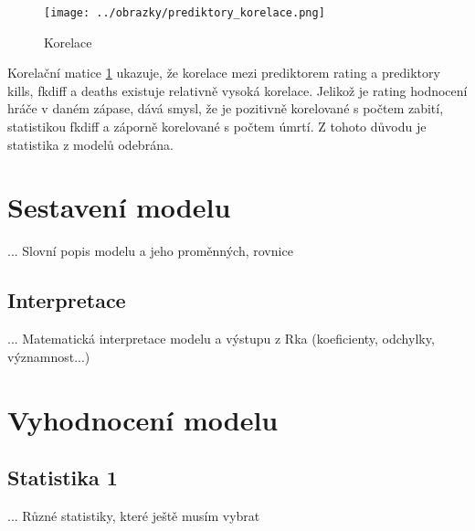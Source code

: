 \begin{figure}[H]
    \centering
    \texttt{[image: ../obrazky/prediktory\_korelace.png]}
    \caption{Korelace} 
    \label{fig:korelacni_matice}
\end{figure}

Korelační matice \ref{fig:korelacni_matice} ukazuje, že korelace mezi prediktorem rating a prediktory kills, fkdiff a deaths existuje relativně vysoká korelace.
Jelikož je rating hodnocení hráče v daném zápase, dává smysl, že je pozitivně korelované s počtem zabití, statistikou fkdiff a záporně korelované s počtem úmrtí.
Z tohoto důvodu je statistika z modelů odebrána.

\section{Sestavení modelu}
... Slovní popis modelu a jeho proměnných, rovnice

\subsection{Interpretace}
... Matematická interpretace modelu a výstupu z Rka (koeficienty, odchylky, významnost...)

\section{Vyhodnocení modelu}
\subsection{Statistika 1}
... Různé statistiky, které ještě musím vybrat
